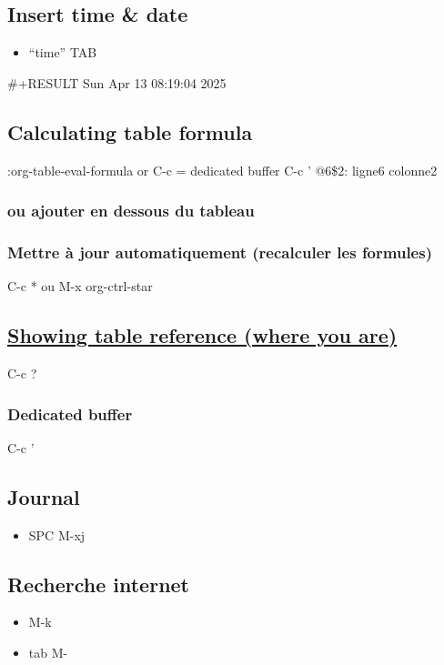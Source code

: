 \documentclass[11pt]{article}
\begin{document}
\subsection*{Insert time \& date}
\label{sec:org37098c0}
\begin{itemize}
\item ``time'' TAB
\end{itemize}
\#+RESULT  Sun Apr 13 08:19:04 2025
\subsection*{Calculating table formula}
\label{sec:org41b9e59}
:org-table-eval-formula or C-c =
dedicated buffer C-c '
@6\$2: ligne6 colonne2
\subsubsection*{ou ajouter en dessous du tableau}
\label{sec:org648af76}
\subsubsection*{Mettre à jour automatiquement (recalculer les formules)}
\label{sec:orgac2209b}
C-c * ou M-x org-ctrl-star
\subsection*{\href{https://orgmode.org/worg/org-tutorials/org-spreadsheet-intro.html}{Showing table reference (where you are)}}
\label{sec:org8b291ae}
C-c ?
\subsubsection*{Dedicated buffer}
\label{sec:org854355a}
C-c '
\subsection*{Journal}
\label{sec:orgcbff454}
\begin{itemize}
\item SPC M-xj
\end{itemize}
\subsection*{Recherche internet}
\label{sec:orgd2ca582}
\begin{itemize}
\item M-k

\item tab M-
\end{itemize}
\end{document}
